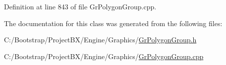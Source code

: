 Definition at line 843 of file GrPolygonGroup.cpp.

The documentation for this class was generated from the following files:\begin{CompactItemize}
\item 
C:/Bootstrap/ProjectBX/Engine/Graphics/\hyperlink{_gr_polygon_group_8h}{GrPolygonGroup.h}\item 
C:/Bootstrap/ProjectBX/Engine/Graphics/\hyperlink{_gr_polygon_group_8cpp}{GrPolygonGroup.cpp}\end{CompactItemize}
